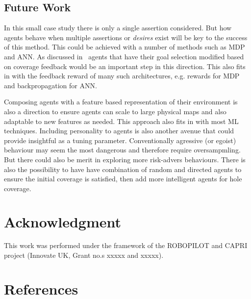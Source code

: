 \documentclass[letterpaper, 10 pt, journal, twoside]{IEEEtran}
\begin{document}
\subsection{Future Work}
%
In this small case study there is only a single assertion considered. But how agents behave when multiple assertions or \textit{desires} exist will be key to the success of this method. This could be achieved with a number of methods such as MDP and ANN.
%
As discussed in~\cite{Eder2007} agents that have their goal selection modified based on coverage feedback would be an important step in this direction. This also fits in with the feedback reward of many such architectures, e.g. rewards for MDP and backpropagation for ANN. 

Composing agents with a feature based representation of their environment is also a direction to ensure agents can scale to large physical maps and also adaptable to new features as needed. This approach also fits in with most ML techniques.
%
Including personality to agents is also another avenue that could provide insightful as a tuning parameter. Conventionally agressive (or egoist) behaviour may seem the most dangerous and therefore require oversampmling. But there could also be merit in exploring more risk-advers behaviours. 
%
There is also the possibility to have have combination of random and directed agents to ensure the initial coverage is satisfied, then add more intelligent agents for hole coverage.

\section*{Acknowledgment}
This work was performed under the framework of the ROBOPILOT and CAPRI project
(Innovate UK, Grant no.s xxxxx and xxxxx). 


\balance
\section*{References}
\printbibliography[heading=none]
\end{document}

